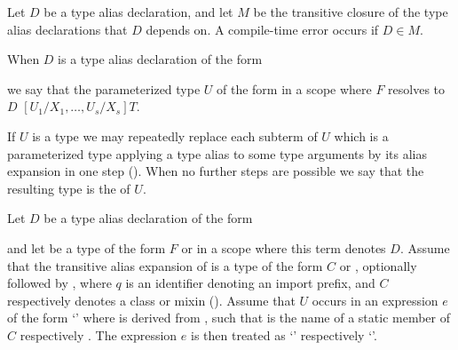 \documentclass[makeidx]{article}
\begin{document}
{\LMHash{}%
Let $D$ be a type alias declaration,
and let $M$ be the transitive closure of
the type alias declarations that $D$ depends on.
A compile-time error occurs if $D \in M$.



\LMHash{}%
When $D$ is a type alias declaration of the form

\noindent
{}

\noindent
we say that the parameterized type $U$ of the form
in a scope where $F$ resolves to $D$
$[U_1/X_1, \ldots, U_s/X_s]T$.


\LMHash{}%
If $U$ is a type we may repeatedly replace each subterm of $U$
which is a parameterized type applying a type alias to some type arguments
by its alias expansion in one step
().
When no further steps are possible we say that the resulting type is the
of $U$.


\LMHash{}%
%
Let $D$ be a type alias declaration of the form

\noindent
{}

\noindent
and let  be a type of the form $F$ or 
in a scope where this term denotes $D$.
Assume that the transitive alias expansion of  is
%
a type of the form $C$ or ,
optionally followed by ,
where $q$ is an identifier denoting an import prefix,
and $C$ respectively  denotes a class or mixin
().
Assume that $U$ occurs in an expression $e$ of the form
`'
where  is derived from ,
such that \id{} is the name of
a static member of $C$ respectively .
The expression $e$ is then treated as
`'
respectively
`'.

}
\end{document}
